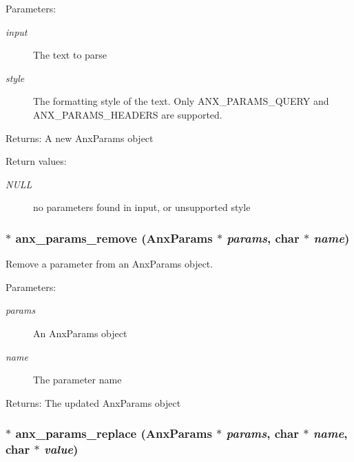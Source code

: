 \begin{Desc}
\item[Parameters:]
\begin{description}
\item[{\em input}]The text to parse \item[{\em style}]The formatting style of the text. Only ANX\_\-PARAMS\_\-QUERY and ANX\_\-PARAMS\_\-HEADERS are supported. \end{description}
\end{Desc}
\begin{Desc}
\item[Returns:]A new Anx\-Params object \end{Desc}
\begin{Desc}
\item[Return values:]
\begin{description}
\item[{\em NULL}]no parameters found in input, or unsupported style \end{description}
\end{Desc}
\subsubsection{$\ast$ anx\_\-params\_\-remove ({\bf Anx\-Params} $\ast$ {\em params}, char $\ast$ {\em name})}\label{anx__params_8h_a10}


Remove a parameter from an Anx\-Params object. 

\begin{Desc}
\item[Parameters:]
\begin{description}
\item[{\em params}]An Anx\-Params object \item[{\em name}]The parameter name \end{description}
\end{Desc}
\begin{Desc}
\item[Returns:]The updated Anx\-Params object \end{Desc}
\subsubsection{$\ast$ anx\_\-params\_\-replace ({\bf Anx\-Params} $\ast$ {\em params}, char $\ast$ {\em name}, char $\ast$ {\em value})}\label{anx__params_8h_a8}


